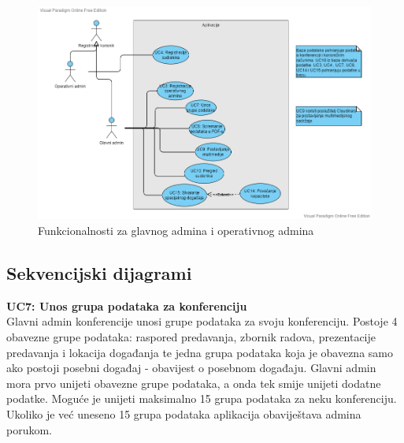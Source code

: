 		                \begin{figure}[H]
			            \includegraphics[scale=0.5]{slike/UC_diagram_2.png} %
			            \centering
			            \caption{Funkcionalnosti za glavnog admina i operativnog admina}
			            \label{fig:uc-dijagram2}
		                \end{figure}
				\eject		
				
			\subsection{Sekvencijski dijagrami}
				
	

            \textbf{UC7: Unos grupa podataka za konferenciju}\\
				
				{Glavni admin konferencije unosi grupe podataka za svoju konferenciju. Postoje 4 obavezne grupe podataka: raspored predavanja, zbornik radova, prezentacije predavanja i lokacija događanja te jedna grupa podataka koja je obavezna samo ako postoji posebni događaj - obavijest o posebnom događaju. Glavni admin mora prvo unijeti obavezne grupe podataka, a onda tek smije unijeti dodatne podatke. Moguće je unijeti maksimalno 15 grupa podataka za neku konferenciju. Ukoliko je već uneseno 15 grupa podataka aplikacija obaviještava admina porukom.}
				
